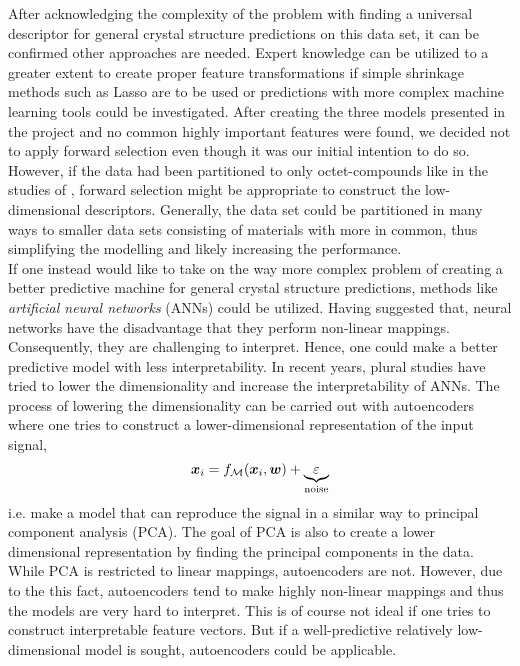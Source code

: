 After acknowledging the complexity of the problem with finding a universal descriptor for general crystal structure predictions on this data set, it can be confirmed other approaches are needed. Expert knowledge can be utilized to a greater extent to create proper feature transformations if simple shrinkage methods such as Lasso are to be used or predictions with more complex machine learning tools could be investigated. After creating the three models presented in the project and no common highly important features were found, we decided not to apply forward selection even though it was our initial intention to do so. However, if the data had been partitioned to only octet-compounds like in the studies of \citep{criticalrole_descriptor}, forward selection might be appropriate to construct the low-dimensional descriptors. Generally, the data set could be partitioned in many ways to smaller data sets consisting of materials with more in common, thus simplifying the modelling and likely increasing the performance. \\
If one instead would like to take on the way more complex problem of creating a better predictive machine for general crystal structure predictions, methods like \emph{artificial neural networks} (ANNs) could be utilized. Having suggested that, neural networks have the disadvantage that they perform non-linear mappings. Consequently, they are challenging to interpret. Hence, one could make a better predictive model with less interpretability. In recent years, plural studies have tried to lower the dimensionality and increase the interpretability of ANNs. The process of lowering the dimensionality can be carried out with autoencoders \citep{2016arXiv161107492S} where one tries to construct a lower-dimensional representation of the input signal,
\begin{equation}
    \bm{x}_i = f_{\mathcal{M}}\qty(\bm{x}_i,\boldsymbol{w}) + \underbrace{\varepsilon}_{\mathrm{noise}}
\end{equation}
i.e. make a model that can reproduce the signal in a similar way to principal component analysis (PCA). The goal of PCA is also to create a lower dimensional representation by finding the principal components in the data. While PCA is restricted to linear mappings, autoencoders are not. However, due to the this fact, autoencoders tend to make highly non-linear mappings and thus the models are very hard to interpret. This is of course not ideal if one tries to construct interpretable feature vectors. But if a well-predictive relatively low-dimensional model is sought, autoencoders could be applicable.

